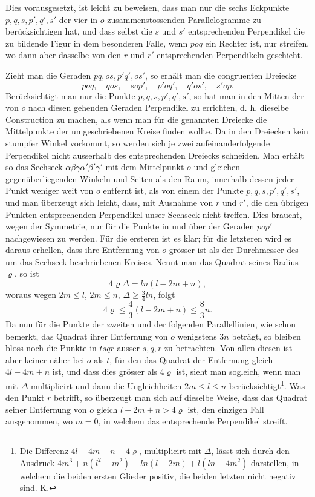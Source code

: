 \documentclass[11pt]{article}
\begin{document}
Dies vorausgesetzt, ist leicht zu beweisen, dass man nur die sechs Eckpunkte $p,q,s,p',q',s'$ der vier in $o$ zusammenstossenden Parallelogramme zu berücksichtigen hat, und dass selbst die $s$ und $s'$ entsprechenden Perpendikel die zu bildende Figur in dem besonderen Falle, wenn $poq$ ein Rechter ist, nur streifen, wo dann aber dasselbe von den $r$ und $r'$ entsprechenden Perpendikeln geschieht.

Zieht man die Geraden $pq,os,p'q',os'$, so erhält man die congruenten Dreiecke
\[
 poq,
 \quad qos,
 \quad sop',
 \quad p'oq',
 \quad q'os',
 \quad s'op.
\]
Berücksichtigt man nur die Punkte $p,q,s,p',q',s'$, so hat man in den Mitten der von $o$ nach diesen gehenden Geraden Perpendikel zu errichten, d. h. dieselbe Construction zu machen, als wenn man für die genannten Dreiecke die Mittelpunkte der umgeschriebenen Kreise finden wollte. Da in den Dreiecken kein stumpfer Winkel vorkommt, so werden sich je zwei aufeinanderfolgende Perpendikel nicht ausserhalb des entsprechenden Dreiecks schneiden. Man erhält so das Sechseck $\alpha\beta\gamma\alpha'\beta'\gamma'$ mit dem Mittelpunkt $o$ und gleichen gegenüberliegenden Winkeln und Seiten als den Raum, innerhalb dessen jeder Punkt weniger weit von $o$ entfernt ist, als von einem der Punkte $p,q,s,p',q',s'$, und man überzeugt sich leicht, dass, mit Ausnahme von $r$ und $r'$, die den übrigen Punkten entsprechenden Perpendikel unser Sechseck nicht treffen. Dies braucht, wegen der Symmetrie, nur für die Punkte in und über der Geraden $pop'$ nachgewiesen zu werden. Für die ersteren ist es klar; für die letzteren wird es daraus erhellen, dass ihre Entfernung von $o$ grösser ist als der Durchmesser des um das Sechseck beschriebenen Kreises. Nennt man das Quadrat seines Radius $\varrho$, so ist
\[
 4\varrho\Delta=ln(l-2m+n),
\]
woraus wegen $2m\le l$, $2m\le n$, $\Delta\ge\frac34 ln$, folgt
\[
 4\varrho\le \frac43(l-2m+n)\le \frac83 n.
\]
Da nun für die Punkte der zweiten und der folgenden Parallellinien, wie schon bemerkt, das Quadrat ihrer Entfernung von $o$ wenigstens $3n$ beträgt, so bleiben bloss noch die Punkte in $tsqr$ ausser $s,q,r$ zu betrachten. Von allen diesen ist aber keiner näher bei $o$ als $t$, für den das Quadrat der Entfernung gleich $4l-4m+n$ ist, und dass dies grösser als $4\varrho$ ist, sieht man sogleich, wenn man mit $\Delta$ multiplicirt und dann die Ungleichheiten $2m\le l\le n$ berücksichtigt\footnote{Die Differenz $4l-4m+n-4\varrho$, multiplicirt mit $\Delta$, lässt sich durch den Ausdruck $4m^3+n(l^2-m^2)+ln(l-2m)+l(ln-4m^2)$ darstellen, in welchem die beiden ersten Glieder positiv, die beiden letzten nicht negativ sind. K.}. Was den Punkt $r$ betrifft, so überzeugt man sich auf dieselbe Weise, dass das Quadrat seiner Entfernung von $o$ gleich $l+2m+n>4\varrho$ ist, den einzigen Fall ausgenommen, wo $m=0$, in welchem das entsprechende Perpendikel streift.
\end{document}
